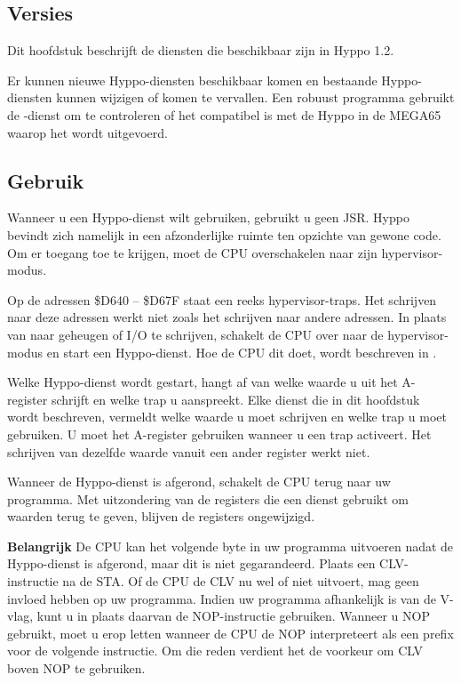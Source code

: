 \filbreak
\subsection{Versies}

Dit hoofdstuk beschrijft de diensten die beschikbaar zijn in Hyppo 1.2.

Er kunnen nieuwe Hyppo-diensten beschikbaar komen en bestaande Hyppo-diensten kunnen wijzigen of komen te vervallen. Een robuust programma gebruikt de -dienst om te controleren of het compatibel is met de Hyppo in de MEGA65 waarop het wordt uitgevoerd.


\subsection{Gebruik}Wanneer u een Hyppo-dienst wilt gebruiken, gebruikt u geen JSR. Hyppo bevindt zich namelijk in een afzonderlijke ruimte ten opzichte van gewone code. Om er toegang toe te krijgen, moet de CPU overschakelen naar zijn hypervisor-modus.

Op de adressen \$D640 -- \$D67F staat een reeks hypervisor-traps. Het schrijven naar deze adressen werkt niet zoals het schrijven naar andere adressen. In plaats van naar geheugen of I/O te schrijven, schakelt de CPU over naar de hypervisor-modus en start een Hyppo-dienst. Hoe de CPU dit doet, wordt beschreven in .

Welke Hyppo-dienst wordt gestart, hangt af van welke waarde u uit het A-register schrijft en welke trap u aanspreekt. Elke dienst die in dit hoofdstuk wordt beschreven, vermeldt welke waarde u moet schrijven en welke trap u moet gebruiken. U moet het A-register gebruiken wanneer u een trap activeert. Het schrijven van dezelfde waarde vanuit een ander register werkt niet.

Wanneer de Hyppo-dienst is afgerond, schakelt de CPU terug naar uw programma. Met uitzondering van de registers die een dienst gebruikt om waarden terug te geven, blijven de registers ongewijzigd.

\textbf{Belangrijk} De CPU kan het volgende byte in uw programma uitvoeren nadat de Hyppo-dienst is afgerond, maar dit is niet gegarandeerd. Plaats een CLV-instructie na de STA. Of de CPU de CLV nu wel of niet uitvoert, mag geen invloed hebben op uw programma. Indien uw programma afhankelijk is van de V-vlag, kunt u in plaats daarvan de NOP-instructie gebruiken. Wanneer u NOP gebruikt, moet u erop letten wanneer de CPU de NOP interpreteert als een prefix voor de volgende instructie. Om die reden verdient het de voorkeur om CLV boven NOP te gebruiken.

